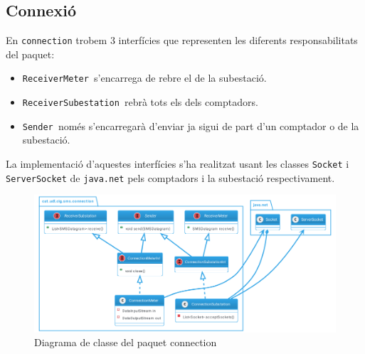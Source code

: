 \subsection{Connexió}
En \texttt{connection} trobem 3 interfícies que representen les diferents responsabilitats del paquet:
\begin{itemize}
	\item \texttt{ReceiverMeter }s'encarrega de rebre el \dto de la subestació.
	\item \texttt{ReceiverSubestation }rebrà tots els \dto dels comptadors.
	\item \texttt{Sender }només s'encarregarà d'enviar \dto ja sigui de part d'un comptador o de la subestació.
\end{itemize}
La implementació d'aquestes interfícies s'ha realitzat usant les classes \texttt{Socket} i \texttt{ServerSocket} de \texttt{java.net} pels comptadors i la subestació respectivament.
\begin{figure}[H]
	\includegraphics[width=15cm]{classes/connection.png}
	\caption{Diagrama de classe del paquet connection}
	\label{fig:connection}
\end{figure}
